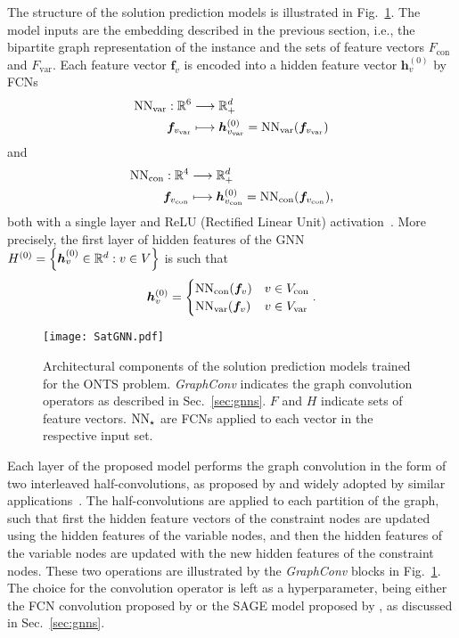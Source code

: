 The structure of the solution prediction models is illustrated in Fig.~\ref{fig:satgnn}.
The model inputs are the embedding described in the previous section, i.e., the bipartite graph representation of the instance and the sets of feature vectors $F_\textrm{con}$ and $F_\textrm{var}$.
Each feature vector $\bm{f}_v$ is encoded into a hidden feature vector $\bm{h}^{(0)}_v$ by FCNs
\begin{align*}
    {\rm NN}_{\rm var}:\mathbb{R}^6& \longrightarrow\mathbb{R}^{d}_+ \\
    \bm{f}_{v_{\rm var}} &\longmapsto \bm{h}^{(0)}_{v_{\rm var}} = {\rm NN}_{\rm var}(\bm{f}_{v_{\rm var}})
\end{align*}
and
\begin{align*}
    {\rm NN}_{\rm con}:\mathbb{R}^4& \longrightarrow\mathbb{R}^{d}_+ \\
    \bm{f}_{v_{\rm con}} &\longmapsto \bm{h}^{(0)}_{v_{\rm con}} = {\rm NN}_{\rm con}(\bm{f}_{v_{\rm con}})
,\end{align*}
both with a single layer and ReLU (Rectified Linear Unit) activation~\cite{goodfellowQualitativelyCharacterizingNeural2015}.
More precisely, the first layer of hidden features of the GNN $H^{(0)}=\left\{ \bm{h}^{(0)}_v \in \mathbb{R}^{d} : v \in V \right\} $ is such that \[
\bm{h}^{(0)}_v = \begin{cases}
    {\rm NN}_{\rm con}(\bm{f}_v) & v \in V_\textrm{con} \\
    {\rm NN}_{\rm var}(\bm{f}_v) & v \in V_\textrm{var}
\end{cases}
.\] 

\begin{figure}[h]
    \centering
    \texttt{[image: SatGNN.pdf]}
    \caption{Architectural components of the solution prediction models trained for the ONTS problem. \emph{GraphConv} indicates the graph convolution operators as described in Sec.~\ref{sec:gnns}. $F$ and $H$ indicate sets of feature vectors. ${\rm NN}_{\star}$ are FCNs applied to each vector in the respective input set.}
    \label{fig:satgnn}
\end{figure}

Each layer of the proposed model performs the graph convolution in the form of two interleaved half-convolutions, as proposed by  and widely adopted by similar applications~\cite{hanGNNGuidedPredictandSearchFramework2023,khalilMIPGNNDataDrivenFramework2022,dingAcceleratingPrimalSolution2020}.
The half-convolutions are applied to each partition of the graph, such that first the hidden feature vectors of the constraint nodes are updated using the hidden features of the variable nodes, and then the hidden features of the variable nodes are updated with the new hidden features of the constraint nodes.
These two operations are illustrated by the \emph{GraphConv} blocks in Fig.~\ref{fig:satgnn}.
The choice for the convolution operator is left as a hyperparameter, being either the FCN convolution proposed by  or the SAGE model proposed by , as discussed in Sec.~\ref{sec:gnns}.

